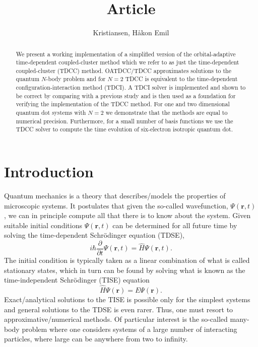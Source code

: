 \documentclass[a4paper,10pt, twocolumn]{article}
\title{Article}
\author{Kristiansen, Håkon Emil}
\begin{document}
\maketitle


\begin{abstract}
We present a working implementation of a simplified version of the orbital-adaptive time-dependent coupled-cluster method which we refer to as 
just the time-dependent coupled-cluster (TDCC) method.  OATDCC/TDCC approximates solutions to the quantum $N$-body problem 
and for $N=2$ TDCC is equivalent to the time-dependent configuration-interaction method (TDCI). 
A TDCI solver is implemented and shown to be correct by comparing with a previous study 
and is then used as a foundation for verifying the implementation of the TDCC method. For one and two dimensional quantum dot 
systems with $N=2$ we demonstrate that the methods are equal to numerical precision. Furthermore, for a small number of basis functions we use the TDCC solver 
to compute the time evolution of six-electron isotropic quantum dot.  
\end{abstract}


\section{Introduction}
Quantum mechanics is a theory that describes/models the properties of microscopic systems. It postulates that given the so-called wavefunction, $\Psi(\mathbf{r},t)$, we can 
in principle compute all that there is to know about the system. 
Given suitable initial conditions $\Psi(\mathbf{r},t)$ can be determined for all future time by solving the time-dependent Schrödinger equation (TDSE),
\begin{equation}
 i \hbar \frac{\partial }{\partial t} \Psi(\mathbf{r},t) = \hat{H} \Psi(\mathbf{r},t).
\end{equation}
The initial condition is typically taken as a linear combination of what is called stationary states, which in turn can be found by solving what is known as the 
time-independent Schrödinger (TISE) equation
\begin{equation}
 \hat{H} \Psi(\mathbf{r}) = E \Psi(\mathbf{r}).
\end{equation}
Exact/analytical solutions to the TISE is possible only for the simplest systems and general solutions to the TDSE is even rarer. Thus, 
one must resort to approximative/numerical methods. Of particular interest is the so-called many-body problem where one considers systems of a large number of interacting particles, 
where large can be anywhere from two to infinity. 
\end{document}

